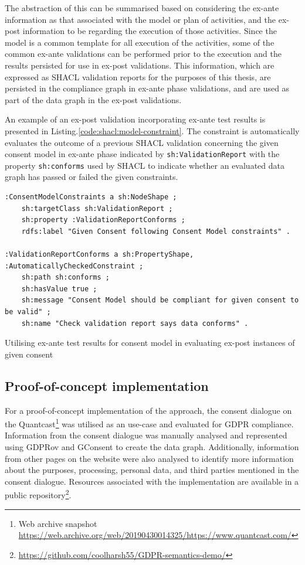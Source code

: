 The abstraction of this can be summarised based on considering the ex-ante information as that associated with the model or plan of activities, and the ex-post information to be regarding the execution of those activities. Since the model is a common template for all execution of the activities, some of the common ex-ante validations can be performed prior to the execution and the results persisted for use in ex-post validations.
This information, which are expressed as SHACL validation reports for the purposes of this thesis, are persisted in the compliance graph in ex-ante phase validations, and are used as part of the data graph in the ex-post validations.

An example of an ex-post validation incorporating ex-ante test results is presented in Listing.\autoref{code:shacl:model-constraint}.
The constraint is automatically evaluates the outcome of a previous SHACL validation concerning the given consent model in ex-ante phase indicated by \texttt{sh:ValidationReport} with the property \texttt{sh:conforms} used by SHACL to indicate whether an evaluated data graph has passed or failed the given constraints.
\begin{listing}[htbp]
\begin{verbatim}
:ConsentModelConstraints a sh:NodeShape ;
    sh:targetClass sh:ValidationReport ; 
    sh:property :ValidationReportConforms ;
    rdfs:label "Given Consent following Consent Model constraints" .

:ValidationReportConforms a sh:PropertyShape, :AutomaticallyCheckedConstraint ;
    sh:path sh:conforms ;
    sh:hasValue true ; 
    sh:message "Consent Model should be compliant for given consent to be valid" ; 
    sh:name "Check validation report says data conforms" .
\end{verbatim}
\caption{Utilising ex-ante test results for consent model in evaluating ex-post instances of given consent}
\label{code:shacl:model-constraint}
\end{listing}

\subsection{Proof-of-concept implementation}\label{sec:testing:shacl:demo}
For a proof-of-concept implementation of the approach, the consent dialogue on the Quantcast\footnote{Web archive snapshot \url{https://web.archive.org/web/20190430014325/https://www.quantcast.com/}} was utilised as an use-case and evaluated for GDPR compliance.
Information from the consent dialogue was manually analysed and represented using GDPRov and GConsent to create the data graph. Additionally, information from other pages on the website were also analysed to identify more information about the purposes, processing, personal data, and third parties mentioned in the consent dialogue.
Resources associated with the implementation are available in a public repository\footnote{\url{https://github.com/coolharsh55/GDPR-semantics-demo/}}.

